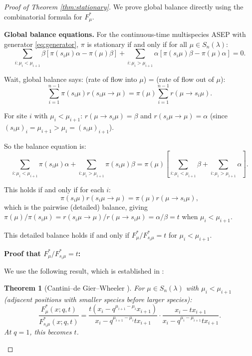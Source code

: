 \documentclass[12pt]{article}
\newtheorem{theorem}{Theorem}
\begin{document}
\begin{proof}[Proof of Theorem \ref{thm:stationary}]
We prove global balance directly using the combinatorial formula for $F^*_\mu$.

\textbf{Global balance equations.} For the continuous-time multispecies ASEP with generator \eqref{eq:generator}, $\pi$ is stationary if and only if for all $\mu \in S_n(\lambda)$:
\begin{equation}\label{eq:gb}
\sum_{i: \mu_i < \mu_{i+1}} \beta [\pi(s_i\mu) \alpha - \pi(\mu)\beta] + \sum_{i: \mu_i > \mu_{i+1}} \alpha[\pi(s_i\mu)\beta - \pi(\mu)\alpha] = 0.
\end{equation}

Wait, global balance says: (rate of flow into $\mu$) = (rate of flow out of $\mu$):
\[
\sum_{i=1}^{n-1} \pi(s_i\mu) r(s_i\mu \to \mu) = \pi(\mu) \sum_{i=1}^{n-1} r(\mu \to s_i\mu).
\]

For site $i$ with $\mu_i < \mu_{i+1}$: $r(\mu \to s_i\mu) = \beta$ and $r(s_i\mu \to \mu) = \alpha$ (since $(s_i\mu)_i = \mu_{i+1} > \mu_i = (s_i\mu)_{i+1}$).

So the balance equation is:
\[
\sum_{i: \mu_i < \mu_{i+1}} \pi(s_i\mu) \alpha + \sum_{i: \mu_i > \mu_{i+1}} \pi(s_i\mu)\beta = \pi(\mu) \left[\sum_{i: \mu_i < \mu_{i+1}} \beta + \sum_{i: \mu_i > \mu_{i+1}} \alpha\right].
\]

This holds if and only if for each $i$:
\[
\pi(s_i\mu) r(s_i\mu \to \mu) = \pi(\mu) r(\mu \to s_i\mu),
\]
which is the pairwise (detailed) balance, giving $\pi(\mu)/\pi(s_i\mu) = r(s_i\mu \to \mu)/r(\mu \to s_i\mu) = \alpha/\beta = t$ when $\mu_i < \mu_{i+1}$.

This detailed balance holds if and only if $F^*_\mu / F^*_{s_i\mu} = t$ for $\mu_i < \mu_{i+1}$.

\textbf{Proof that $F^*_\mu / F^*_{s_i\mu} = t$:}

We use the following result, which is established in \cite{Cantini2015,Corteel2021}:

\begin{theorem}[Cantini--de Gier--Wheeler \cite{Cantini2015}]\label{thm:CDW}
For $\mu \in S_n(\lambda)$ with $\mu_i < \mu_{i+1}$ (adjacent positions with smaller species before larger species):
\[
\frac{F^*_\mu(x; q, t)}{F^*_{s_i\mu}(x; q, t)} = \frac{t(x_i - q^{\mu_{i+1} - \mu_i} x_{i+1})}{x_i - q^{\mu_{i+1}-\mu_i} t x_{i+1}} \cdot \frac{x_i - t x_{i+1}}{x_i - q^{\mu_i - \mu_{i+1}} t x_{i+1}}.
\]
At $q = 1$, this becomes $t$.
\end{theorem}


\end{proof}
\end{document}
